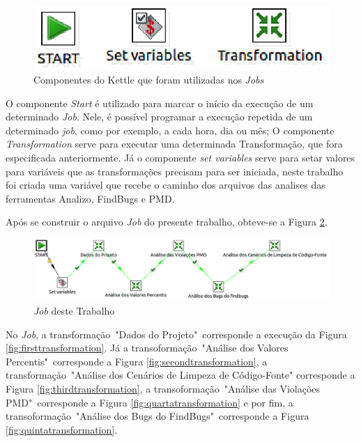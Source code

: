\begin{apendicesenv}
\begin{figure}[h!]
\centering
\includegraphics[keepaspectratio=false,scale=0.60]{figuras/figuras_nilton/componentesjob.eps}
\caption{Componentes do Kettle que foram utilizadas nos \textit{Jobs}}
\label{fig:componentsjob}
\end{figure}
\FloatBarrier

O componente \textit{Start} é utilizado para marcar o início da execução de um determinado \textit{Job}. Nele, é possível programar a execução repetida de um determinado \textit{job}, como por exemplo, a cada hora, dia ou mês; O componente \textit{Transformation} serve para executar uma determinada Transformação, que fora especificada anteriormente. Já o componente \textit{set variables} serve para setar valores para variáveis que as transformações precisam para ser iniciada, neste trabalho foi criada uma variável que recebe o caminho dos arquivos das analises das ferramentas Analizo, FindBugs e PMD. 

Após se construir o arquivo \textit{Job} do presente trabalho, obteve-se a Figura \ref{fig:job}. 

\begin{figure}[h!]
\centering
\includegraphics[keepaspectratio=false,scale=0.45]{figuras/figuras_nilton/job.eps}
\caption{\textit{Job} deste Trabalho}
\label{fig:job}
\end{figure}
\FloatBarrier

No \textit{Job}, a transformação~"Dados do Projeto"~corresponde a execução da Figura \ref{fig:firsttransformation}. Já a transoformação~"Análise dos Valores Percentis"~corresponde a Figura \ref{fig:secondtransformation}, a transformação~"Análise dos Cenários de Limpeza de Código-Fonte" corresponde a Figura \ref{fig:thirdtransformation}, a transoformação~"Análise das Violações PMD"~corresponde a Figura \ref{fig:quartatransformation} e por fim, a transoformação~"Análise dos Bugs do FindBugs"~corresponde a Figura \ref{fig:quintatransformation}.




\end{apendicesenv}
